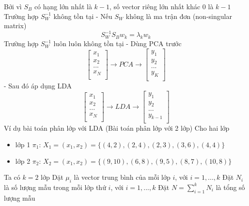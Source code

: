 \documentclass{article}
\begin{document}
	Bởi vì $S_B$ có hạng lớn nhất là $k-1$, số vector riêng lớn nhất khác 0 là $k-1$\newline
	Trường hợp $S_W^{-1}$ không tồn tại
	- Nếu $S_W$ không là ma trận đơn (non-singular matrix)
	$$S_W^{-1}S_Bw_k = \lambda_kw_k$$
	Trường hợp $S_W^{-1}$ luôn luôn không tồn tại\newline
	- Dùng PCA trước
	$$
	\begin{bmatrix}
		x_1 \\
		x_2 \\
		... \\
		x_N \\
	\end{bmatrix} \longrightarrow PCA \longrightarrow \begin{bmatrix}
		y_1 \\
		y_2 \\
		... \\
		y_K \\
	\end{bmatrix}
	$$
	- Sau đó áp dụng LDA
	$$
	\begin{bmatrix}
		x_1 \\
		x_2 \\
		... \\
		x_N \\
	\end{bmatrix} \longrightarrow LDA \longrightarrow \begin{bmatrix}
		y_1 \\
		y_2 \\
		... \\
		y_{k-1} \\
	\end{bmatrix}
	$$
	Ví dụ bài toán phân lớp với LDA (Bài toán phân lớp với 2 lớp)\newline
	Cho hai lớp \newline
	\begin{itemize}
		\item lớp 1 $\pi_1$: $X_1 = (x_1, x_2) = \{(4,2),(2,4),(2,3),(3,6),(4,4)\}$
		\item lớp 2 $\pi_2$: $X_2 = (x_1, x_2) = \{(9,10),(6,8),(9,5),(8,7),(10,8)\}$
	\end{itemize}	
	Ta có $k = 2$ lớp\newline
	Dặt $\mu_i$ là vector trung bình của mỗi lớp $i$, với $i = 1, ..., k$\newline
	Đặt $N_i$ là số lượng mẫu trong mỗi lớp thứ  $i$, với $i = 1, ..., k$\newline
	Đặt $N = \sum_{i=1}^kN_i$ là tổng số lượng mẫu\newline
\end{document}

